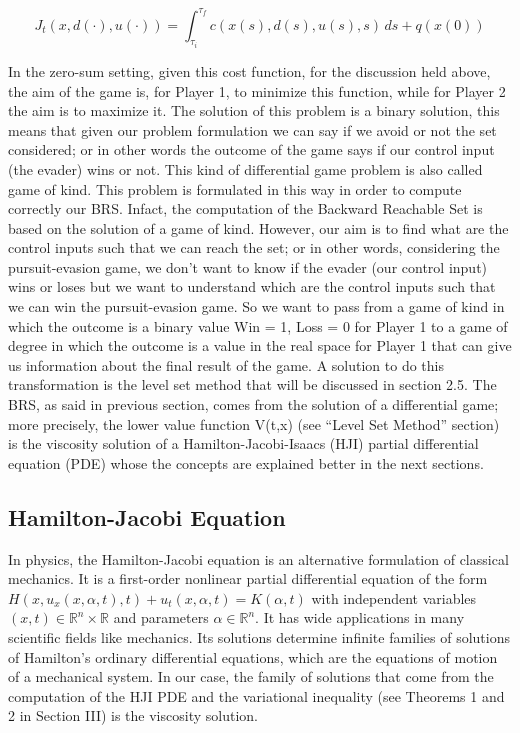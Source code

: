 \begin{equation}
	J_t(x, d(\cdot),u(\cdot))  = \int_{\tau_i}^{\tau_f} c(x(s),d(s),u(s),s)  \,ds + q(x(0)) 
\end{equation}

In the zero-sum setting, given this cost function, for the discussion held above, the aim of the game is, for Player 1, to minimize this function, while for Player 2 the aim is to maximize it.
The solution of this problem is a binary solution, this means that given our problem formulation we can say if we avoid or not the set considered; or in other words the outcome of the game says if our control input (the evader) wins or not. This kind of differential game problem is also called game of kind. This problem is formulated in this way in order to compute correctly our BRS. Infact, the computation of the Backward Reachable Set is based on the solution of a game of kind. However, our aim is to find what are the control inputs such that we can reach the set; or in other words, considering the pursuit-evasion game, we don't want to know if the evader (our control input) wins or loses but we want to understand which are the control inputs such that we can win the pursuit-evasion game. So we want to pass from a game of kind in which the outcome is a binary value {Win = 1, Loss = 0} for Player 1 to a game of degree in which the outcome is a value in the real space for Player 1 that can give us information about the final result of the game. A solution to do this transformation is the level set method that will be discussed in section 2.5.  
The BRS, as said in previous section, comes from the solution of a differential game; more precisely, the lower value function V(t,x) (see “Level Set Method” section) is the viscosity solution of a Hamilton-Jacobi-Isaacs (HJI) partial differential equation (PDE) whose the concepts are explained better in the next sections. 

\subsection{Hamilton-Jacobi Equation}					
In physics, the Hamilton-Jacobi equation is an alternative formulation of classical mechanics. It is a first-order nonlinear partial differential equation of the form $H(x,u_x(x,\alpha,t),t)+u_t(x,\alpha,t)=K(\alpha,t)$ with independent variables $(x,t)\in \mathbb{R}^n \times \mathbb{R}$ and parameters $\alpha \in \mathbb{R}^n$. It has wide applications in many scientific fields like mechanics. Its solutions determine infinite families of solutions of Hamilton's ordinary differential equations, which are the equations of motion of a mechanical system. In our case, the family of solutions that come from the computation of the HJI PDE and the variational inequality (see Theorems 1 and 2 in Section III) is the viscosity solution. 

